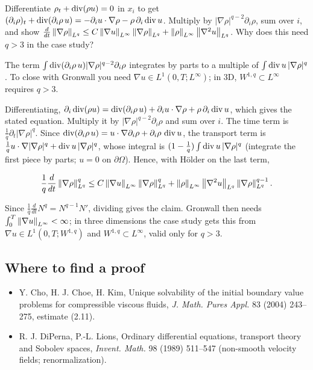 \begin{exercise}
  Differentiate $\rho_t + \operatorname{div}(\rho u) = 0$ in $x_i$ to get $(\partial_i\rho)_t + \operatorname{div}(\partial_i\rho\,u) = -\partial_i u\cdot\nabla\rho - \rho\,\partial_i\operatorname{div} u$. Multiply by $|\nabla\rho|^{q-2}\partial_i\rho$, sum over $i$, and show $\frac{d}{dt}\left\lVert \nabla\rho\right\rVert_{L^q} \le C\left\lVert \nabla u\right\rVert_{L^\infty}\left\lVert \nabla\rho\right\rVert_{L^q} + \left\lVert \rho\right\rVert_{L^\infty}\left\lVert \nabla^2u\right\rVert_{L^q}$. Why does this need $q > 3$ in the case study?
  \begin{hint}
    The term $\int\operatorname{div}(\partial_i\rho\,u)|\nabla\rho|^{q-2}\partial_i\rho$ integrates by parts to a multiple of $\int\operatorname{div} u\,|\nabla\rho|^q$. To close with Gronwall you need $\nabla u \in L^1(0,T;L^\infty)$; in 3D, $W^{1,q} \subset L^\infty$ requires $q > 3$.
  \end{hint}
  \begin{solution}
    Differentiating, $\partial_i\operatorname{div}(\rho u) = \operatorname{div}(\partial_i\rho\,u) + \partial_iu\cdot\nabla\rho + \rho\,\partial_i\operatorname{div} u$, which gives the stated equation. Multiply it by $|\nabla\rho|^{q-2}\partial_i\rho$ and sum over $i$. The time term is $\frac1q\partial_t|\nabla\rho|^q$. Since $\operatorname{div}(\partial_i\rho\,u) = u\cdot\nabla\partial_i\rho + \partial_i\rho\,\operatorname{div} u$, the transport term is $\frac1qu\cdot\nabla|\nabla\rho|^q + \operatorname{div} u\,|\nabla\rho|^q$, whose integral is $(1 - \frac1q)\int\operatorname{div} u\,|\nabla\rho|^q$ (integrate the first piece by parts; $u = 0$ on $\partial\Omega$). Hence, with Hölder on the last term,

    \[ \frac1q\frac{d}{dt}\left\lVert \nabla\rho\right\rVert_{L^q}^q \le C\left\lVert \nabla u\right\rVert_{L^\infty}\left\lVert \nabla\rho\right\rVert_{L^q}^q
             + \left\lVert \rho\right\rVert_{L^\infty}\left\lVert \nabla^2u\right\rVert_{L^q}\left\lVert \nabla\rho\right\rVert_{L^q}^{q-1}. \]

    Since $\frac1q\frac{d}{dt}N^q = N^{q-1}N'$, dividing gives the claim. Gronwall then needs $\int_0^T\left\lVert \nabla u\right\rVert_{L^\infty} < \infty$; in three dimensions the case study gets this from $\nabla u \in L^1(0,T;W^{1,q})$ and $W^{1,q} \subset L^\infty$, valid only for $q > 3$.
  \end{solution}
\end{exercise}

\subsection*{Where to find a proof}

\begin{itemize}
\item Y. Cho, H. J. Choe, H. Kim, Unique solvability of the initial boundary value problems for compressible viscous fluids, \emph{J. Math. Pures Appl.} 83 (2004) 243--275, estimate (2.11).
\item R. J. DiPerna, P.-L. Lions, Ordinary differential equations, transport theory and Sobolev spaces, \emph{Invent. Math.} 98 (1989) 511--547 (non-smooth velocity fields; renormalization).
\end{itemize}

\neededfor
